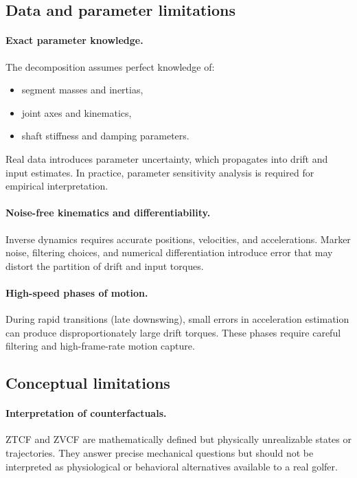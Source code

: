 \documentclass[12pt]{article}
\begin{document}
\subsection{Data and parameter limitations}

\paragraph{Exact parameter knowledge.}
The decomposition assumes perfect knowledge of:
\begin{itemize}
  \item segment masses and inertias,
  \item joint axes and kinematics,
  \item shaft stiffness and damping parameters.
\end{itemize}
Real data introduces parameter uncertainty, which propagates into drift and input estimates. In practice, parameter sensitivity analysis is required for empirical interpretation.

\paragraph{Noise-free kinematics and differentiability.}
Inverse dynamics requires accurate positions, velocities, and accelerations. Marker noise, filtering choices, and numerical differentiation introduce error that may distort the partition of drift and input torques.

\paragraph{High-speed phases of motion.}
During rapid transitions (late downswing), small errors in acceleration estimation can produce disproportionately large drift torques. These phases require careful filtering and high-frame-rate motion capture.

\subsection{Conceptual limitations}

\paragraph{Interpretation of counterfactuals.}
ZTCF and ZVCF are mathematically defined but physically unrealizable states or trajectories. They answer precise mechanical questions but should not be interpreted as physiological or behavioral alternatives available to a real golfer.
\end{document}

